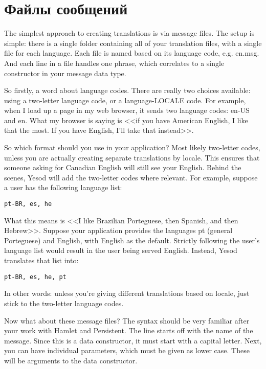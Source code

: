 \section{Файлы сообщений} %

The simplest approach to creating translations is via message files. The setup is simple: there is a single folder containing all of your translation files, with a single file for each language. Each file is named based on its language code, e.g. en.msg. And each line in a file handles one phrase, which correlates to a single constructor in your message data type.


So firstly, a word about language codes. There are really two choices available: using a two-letter language code, or a language-LOCALE code. For example, when I load up a page in my web browser, it sends two language codes: en-US and en. What my browser is saying is <<if you have American English, I like that the most. If you have English, I'll take that instead>>.

So which format should you use in your application? Most likely two-letter codes, unless you are actually creating separate translations by locale. This ensures that someone asking for Canadian English will still see your English. Behind the scenes, Yesod will add the two-letter codes where relevant. For example, suppose a user has the following language list:

\begin{lstlisting}
pt-BR, es, he
\end{lstlisting}

What this means is <<I like Brazilian Porteguese, then Spanish, and then Hebrew>>. Suppose your application provides the languages pt (general Porteguese) and English, with English as the default. Strictly following the user's language list would result in the user being served English. Instead, Yesod translates that list into:

\begin{lstlisting}
pt-BR, es, he, pt
\end{lstlisting}

In other words: unless you're giving different translations based on locale, just stick to the two-letter language codes.

Now what about these message files? The syntax should be very familiar after your work with Hamlet and Persistent. The line starts off with the name of the message. Since this is a data constructor, it must start with a capital letter. Next, you can have individual parameters, which must be given as lower case. These will be arguments to the data constructor.

